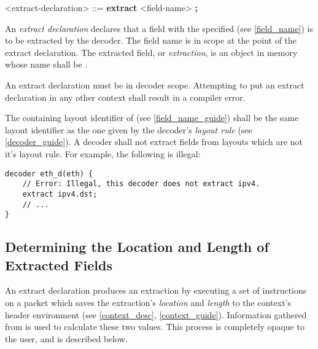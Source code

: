 \begin{grammar}
<extract-declaration> ::=
\textbf{extract} <field-name> \textbf{;}
\end{grammar}

An \textit{extract declaration} declares that a field with the specified  (see \ref{field_name}) is to be extracted by the decoder. The field name is in scope at the point of the extract declaration. The extracted field, or \textit{extraction}, is an object in memory whose name shall be .

An extract declaration must be in decoder scope. Attempting to put an extract declaration in any other context shall result in a compiler error.

The containing layout identifier of  (see \ref{field_name_guide}) shall be the same layout identifier as the one given by the decoder's \textit{layout rule} (see \ref{decoder_guide}). A decoder shall not extract fields from layouts which are not it's layout rule. For example, the following is illegal:

\begin{minip}
\begin{lstlisting}
decoder eth_d(eth) {
	// Error: Illegal, this decoder does not extract ipv4.
	extract ipv4.dst; 
	// ...
}
\end{lstlisting}
\end{minip}

\subsection{Determining the Location and Length of Extracted Fields}

An extract declaration produces an extraction by executing a set of instructions on a packet which saves the extraction's \textit{location} and \textit{length} to the context's header environment (see \ref{context_desc}, \ref{context_guide}). Information gathered from  is used to calculate these two values. This process is completely opaque to the user, and is described below.

